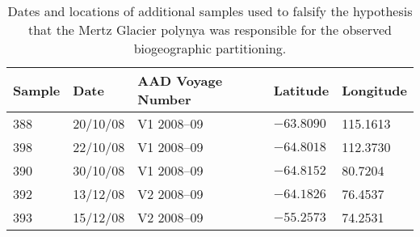 \begin{table}
\caption[Additional samples used to test polynya hypothesis]{Dates and locations of additional samples used to falsify the hypothesis that the Mertz Glacier polynya was responsible for the observed biogeographic partitioning.}
\label{tab:additionalsamples}
\smallskip
\begin{center}
\begin{tabular}{lllll}
\toprule
\textbf{Sample} & \textbf{Date} & \textbf{\ac{AAD} Voyage Number} & \textbf{Latitude} & \textbf{Longitude}\\
\midrule
388 & 20/10/08 & V1 2008--09 & $-63.8090$ & 115.1613\\
398 & 22/10/08 & V1 2008--09 & $-64.8018$ & 112.3730\\
390 & 30/10/08 & V1 2008--09 & $-64.8152$ & 80.7204\\
392 & 13/12/08 & V2 2008--09 & $-64.1826$ & 76.4537\\
393 & 15/12/08 & V2 2008--09 & $-55.2573$ & 74.2531\\
\bottomrule
\end{tabular}
\end{center}
\end{table}
